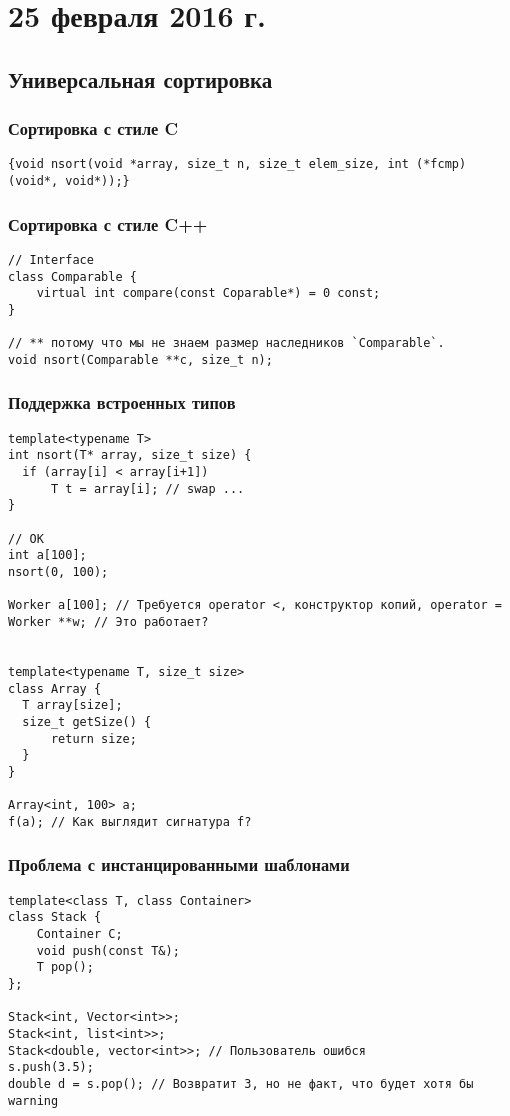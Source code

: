 \section{25 февраля 2016 г.}

\subsection{Универсальная сортировка}

\subsubsection*{Сортировка с стиле C}
\begin{verbatim}
{void nsort(void *array, size_t n, size_t elem_size, int (*fcmp)(void*, void*));}
\end{verbatim}

\subsubsection*{Сортировка с стиле C++}
\begin{verbatim}
// Interface
class Comparable {
    virtual int compare(const Coparable*) = 0 const;
}

// ** потому что мы не знаем размер наследников `Comparable`.
void nsort(Comparable **c, size_t n);
\end{verbatim}

\subsubsection*{Поддержка встроенных типов}

\begin{verbatim}
template<typename T>
int nsort(T* array, size_t size) {
  if (array[i] < array[i+1])
      T t = array[i]; // swap ...
}

// OK
int a[100];
nsort(0, 100); 

Worker a[100]; // Требуется operator <, конструктор копий, operator =
Worker **w; // Это работает?


template<typename T, size_t size>
class Array {
  T array[size];
  size_t getSize() {
      return size;
  }
}

Array<int, 100> a;
f(a); // Как выглядит сигнатура f?
\end{verbatim}

\subsubsection*{Проблема с инстанцированными шаблонами}
\begin{verbatim}
template<class T, class Container>
class Stack {
    Container C;
    void push(const T&);
    T pop();
};

Stack<int, Vector<int>>;
Stack<int, list<int>>;
Stack<double, vector<int>>; // Пользователь ошибся
s.push(3.5);
double d = s.pop(); // Возвратит 3, но не факт, что будет хотя бы warning
\end{verbatim}


